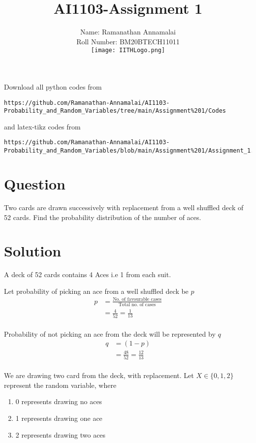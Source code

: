\documentclass[journal,12pt,twocolumn]{IEEEtran}
\begin{document}
\title{AI1103-Assignment 1}
\author{Name: Ramanathan Annamalai\\\normalsize{Roll Number: BM20BTECH11011\\\texttt{[image: IITHLogo.png]}}}
\maketitle
\newpage
\bigskip
\renewcommand{\thefigure}{\theenumi}
\renewcommand{\thetable}{\theenumi}
Download all python codes from 
\begin{lstlisting}
https://github.com/Ramanathan-Annamalai/AI1103-Probability_and_Random_Variables/tree/main/Assignment%201/Codes
\end{lstlisting}
%
and latex-tikz codes from 
%
\begin{lstlisting}
https://github.com/Ramanathan-Annamalai/AI1103-Probability_and_Random_Variables/blob/main/Assignment%201/Assignment_1.tex
\end{lstlisting}
\section*{Question}
Two cards are drawn successively with replacement from a well shuffled deck of 52 cards. Find the probability distribution of the number of aces.

\section*{Solution}
A deck of 52 cards contains 4 Aces i.e 1 from each suit.


Let probability of picking an ace from a well shuffled deck be \(p\)
\begin{align}
    p &= \frac{\text{No. of favourable cases}}{\text{Total no. of cases}}\nonumber\\
    &=\frac{4}{52} = \frac{1}{13}\\\nonumber
\end{align}

Probability of not picking an ace from the deck will be represented by \(q\)
\begin{align}
    q&=(1-p)\nonumber\\
    &=\frac{48}{52} = \frac{12}{13}\\\nonumber
\end{align}

We are drawing two card from the deck, with replacement. Let \(X \in \{0,1,2\}\) represent the random variable, where
\begin{enumerate}
    \item 0 represents drawing no aces
    \item 1 represents drawing one ace
    \item 2 represents drawing two aces
\end{enumerate}
\end{document}
